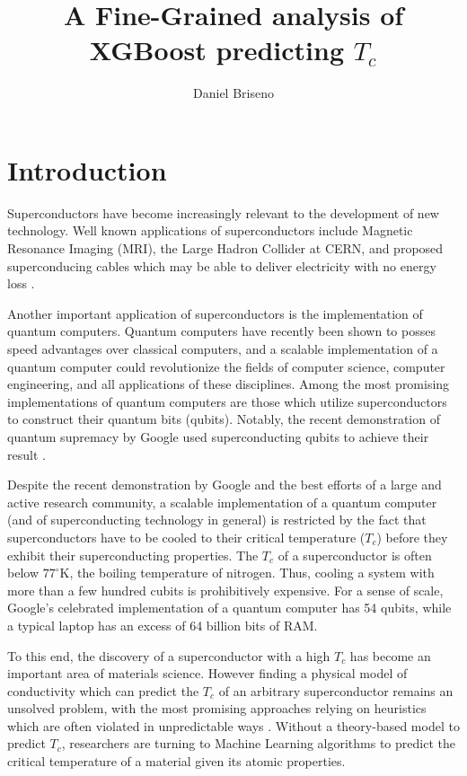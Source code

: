 \documentclass[oneside,12pt]{amsart}
\title{A Fine-Grained analysis of XGBoost predicting $T_c$ }
\author{Daniel Briseno}
\date{}
\begin{document}
\maketitle
\section{Introduction}

Superconductors have become increasingly relevant to the development of new technology. Well known applications of superconductors include Magnetic Resonance Imaging (MRI), the Large Hadron Collider at CERN, and proposed superconducing cables which may be able to deliver electricity with no energy loss \cite{hamidieh_data-driven_2018}. 

Another important application of superconductors is the implementation of quantum computers. Quantum computers have recently been shown to posses speed advantages over classical computers, and a scalable implementation of a quantum computer could revolutionize the fields of computer science, computer engineering, and all applications of these disciplines. Among the most promising implementations of quantum computers are those which utilize superconductors to construct their quantum bits (qubits). Notably, the recent demonstration of quantum supremacy by Google used superconducting qubits to achieve their result \cite{supremacy_quantum_2019}. 

Despite the recent demonstration by Google and the best efforts of a large and active research community, a scalable implementation of a quantum computer (and of superconducting technology in general) is restricted by the fact that superconductors have to be cooled to their critical temperature ($T_c$) before they exhibit their superconducting properties. The $T_c$ of a superconductor is often below $77^\circ$K, the boiling temperature of nitrogen\cite{hamidieh_data-driven_2018}. Thus, cooling a system with more than a few hundred cubits is prohibitively expensive. For a sense of scale, Google's celebrated implementation of a quantum computer has 54 qubits, while a typical laptop has an excess of 64 billion bits of RAM.

To this end, the discovery of a superconductor with a high $T_c$ has become an important area of materials science. However finding a physical model of conductivity which can predict the $T_c$ of an arbitrary superconductor remains an unsolved problem, with the most promising approaches relying on heuristics which are often violated in unpredictable ways \cite{hamidieh_data-driven_2018}. Without a theory-based model to predict $T_c$, researchers are turning to Machine Learning algorithms to predict the critical temperature of a material given its atomic properties.
\end{document}
